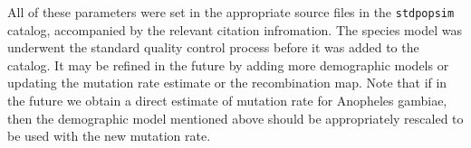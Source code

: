 \documentclass[hidelinks]{article}
\begin{document}
All of these parameters were set in the appropriate source files in the \texttt{stdpopsim} catalog, accompanied by the relevant citation infromation.
The species model was underwent the standard quality control process before it was added to the catalog. It may be refined in the future by adding more demographic models or updating the mutation rate estimate or the recombination map. Note that if in the future we obtain a direct estimate of mutation rate for Anopheles gambiae, then the demographic model mentioned above should be appropriately rescaled to be used with the new mutation rate.



%
%
%
%
\end{document}
